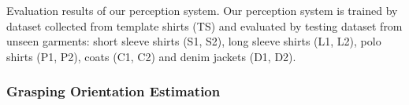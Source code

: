 \documentclass[letterpaper, 10 pt, conference]{ieeeconf}  %
\begin{document}
\begin{table}[t!]
   \centering
    \vspace{4mm}
   \caption{Perception Evaluation Results of Seen and Unseen Garments}\label{tab:perception}
        \vspace{-2mm}
   \par
    \begin{flushleft}
Evaluation results of our perception system. Our perception system is trained by dataset collected from template shirts (TS) and evaluated by testing dataset from unseen garments: short sleeve shirts (S1, S2), long sleeve shirts (L1, L2), polo shirts (P1, P2), coats (C1, C2) and denim jackets (D1, D2).
    \end{flushleft}
    \vspace{-10pt}
\end{table}

\subsubsection{Grasping Orientation Estimation}
\end{document}
